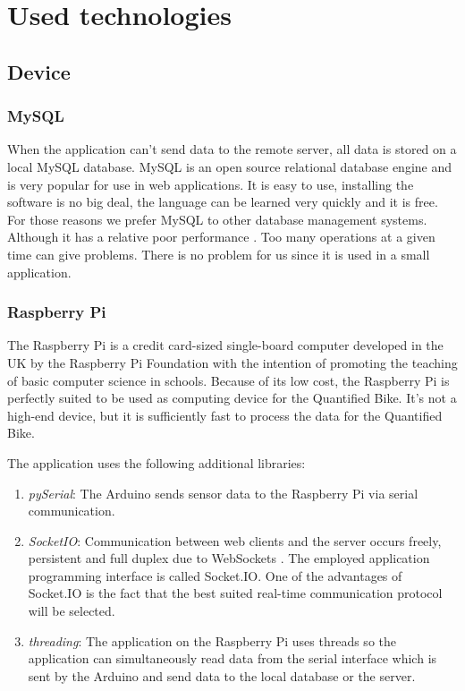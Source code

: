 \section{Used technologies}
\subsection{Device}
\subsubsection{MySQL}
When the application can't send data to the remote server, all data is stored on a local MySQL database. MySQL is an open source relational database engine and is very popular for use in web applications. It is easy to use, installing the software is no big deal, the language can be learned very quickly and it is free. For those reasons we prefer MySQL to other database management systems. Although it has a relative poor performance \cite{MySQLDatarealm}. Too many operations at a given time can give problems. There is no problem for us since it is used in a small application.
\subsubsection{Raspberry Pi}
The Raspberry Pi is a credit card-sized single-board computer developed in the UK by the Raspberry Pi Foundation with the intention of promoting the teaching of basic computer science in schools.\cite{RaspberryWikipedia}
Because of its low cost, the Raspberry Pi is perfectly suited to be used as computing device for the Quantified Bike. 
It's not a high-end device, but it is sufficiently fast to process the data for the Quantified Bike.

The application uses the following additional libraries:
\begin{enumerate}
 \item \textit{pySerial}: The Arduino sends sensor data to the Raspberry Pi via serial communication.
 \item \textit{SocketIO}: Communication between web clients and the server occurs freely, persistent and full duplex due to WebSockets \cite{SocketIOKaazing}. The employed application programming interface is called Socket.IO. One of the advantages of Socket.IO is the fact that the best suited real-time communication protocol will be selected. \cite{SocketIOWikipedia}
 \item \textit{threading}: The application on the Raspberry Pi uses threads so the application can simultaneously read data from the serial interface which is sent by the Arduino and send data to the local database or the server.
\end{enumerate}

